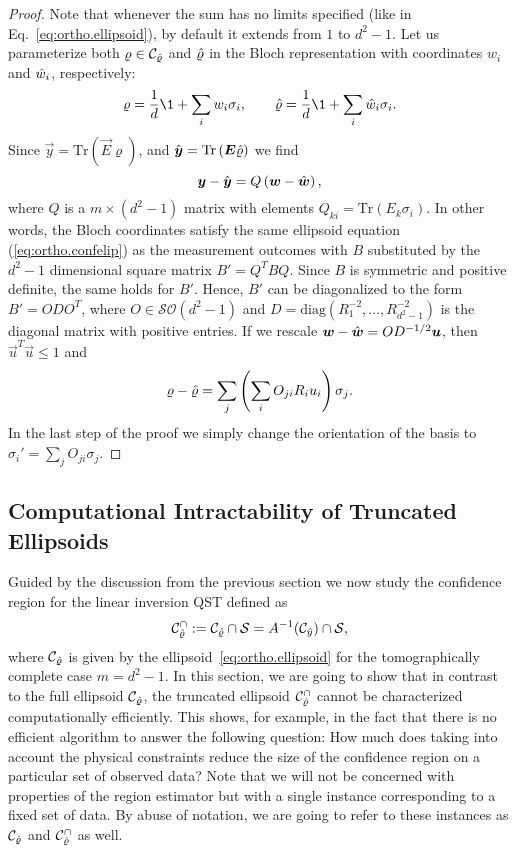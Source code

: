 \begin{proof}
  Note that whenever the sum has no limits specified (like in Eq.~\eqref{eq:ortho.ellipsoid}), by default it extends from $1$ to $d^{2}-1$.
  Let us parameterize both $\varrho \in \mathcal{C}_{\hat{\varrho}}$ and $\hat{\varrho}$ in the Bloch representation with coordinates $w_{i}$ and $\hat{w}_i$, respectively:
  \[
    \varrho=\frac{1}{d}\1 + \sum_{i}w_{i}\sigma_{i},
    \qquad\estim{\varrho}=\frac{1}{d} \1 + \sum_{i}\estim{w}_{i}\sigma_{i}.
  \]
  Since $\vec{y}=\textrm{Tr}\left(\vec{E}\varrho\right)$, and $\hat{\boldsymbol{y}}=\textrm{Tr}\left(\boldsymbol{E}\hat{\varrho}\right)$ we find
  \[
    \boldsymbol{y}-\hat{\boldsymbol{y}}=Q\left(\boldsymbol{w}-\hat{\boldsymbol{w}}\right),
  \]
  where $Q$ is a $m\times(d^{2}-1)$ matrix with elements $Q_{ki}=\textrm{Tr}\left(E_{k}\sigma_{i}\right)$.
  In other words, the Bloch coordinates satisfy the same ellipsoid equation (\ref{eq:ortho.confelip}) as the measurement outcomes with $B$ substituted by the $d^{2}-1$ dimensional square matrix $B'=Q^{T}BQ$.
  Since $B$ is symmetric and positive definite, the same holds for $B'$.
  Hence, $B'$ can be diagonalized to the form $B'=ODO^{T}$, where $O \in \mathcal{SO}(d^2 - 1)$ and $D=\textrm{diag}(R_{1}^{-2},\ldots,R_{d^{2}-1}^{-2})$ is the diagonal matrix with positive entries.
  If we rescale $\boldsymbol{w}-\hat{\boldsymbol{w}}=OD^{-1/2}\boldsymbol{u}$, then $\vec{u}^{T}\vec{u}\leq1$ and
  \[
    \varrho-\hat{\varrho}=\sum_{j}\left(\sum_{i}O_{ji}R_{i}u_{i}\right)\sigma_{j}.
  \]
  In the last step of the proof we simply change the orientation of the basis to $\sigma_{i}'=\sum_{j}O_{ji}\sigma_{j}$.
\end{proof}


\subsection{Computational Intractability of Truncated Ellipsoids}
\label{sub:ortho.hard}

Guided by the discussion from the previous section we now study the confidence region for the linear inversion QST defined as
\[
  \label{eq:ortho.truncated_ellipsoid}
  \mathcal{C}_{\hat{\varrho}}^\cap := \mathcal{C}_{\hat{\varrho}} \cap \mathcal{S} = A^{-1}(\mathcal{C}_{\hat{y}}) \cap \mathcal{S},
\]
where $\mathcal{C}_{\hat{\varrho}}$ is given by the ellipsoid~\eqref{eq:ortho.ellipsoid} for the tomographically complete case $m=d^2 - 1$.
In this section, we are going to show that in contrast to the full ellipsoid $\mathcal{C}_{\hat{\varrho}}$, the truncated ellipsoid $\mathcal{C}_{\hat{\varrho}}^\cap$ cannot be characterized computationally efficiently.
This shows, for example, in the fact that there is no efficient algorithm to answer the following question:
How much does taking into account the physical constraints reduce the size of the confidence region on a particular set of observed data?
Note that we will not be concerned with properties of the region estimator but with a single instance corresponding to a fixed set of data.
By abuse of notation, we are going to refer to these instances as $\mathcal{C}_{\hat{\varrho}}$ and $\mathcal{C}_{\hat{\varrho}}^\cap$ as well.


